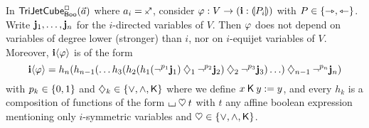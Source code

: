 \documentclass[a4paper]{article}
\begin{document}
\begin{lemma} \label{thm:char-jet-cube-to-line}
	In $\mathsf{TriJetCube}^{\Box}_{\mathsf{Boo}}\mathopen{}\left( \vec a \right)\mathclose{}$ where $a_i = \ypolar$, consider $\varphi : V \to (\mathbf{i} : {\llparenthesis P_i \rrparenthesis})$ with $P \in \mathopen{}\left\{ \rightarrowtriangle, \leftarrowtriangle \right\}\mathclose{}$.
	Write $\mathbf{j}_1, \ldots, \mathbf{j}_n$ for the $i$-directed variables of $V$.
	Then $\varphi$ does not depend on variables of degree lower (stronger) than $i$, nor on $i$-equijet variables of $V$.
	Moreover, $\mathbf{i} \langle \varphi \rangle$ is of the form
	\[
		\mathbf{i} \langle \varphi \rangle = h_n(h_{n-1}(\ldots h_3(h_2(h_1(\lnot^{p_1} \mathbf{j}_1) \mathbin{\diamondsuit}_1 \lnot^{p_2} \mathbf{j}_2) \mathbin{\diamondsuit}_2 \lnot^{p_3} \mathbf{j}_3) \ldots ) \mathbin{\diamondsuit}_{n-1} \lnot^{p_n} \mathbf{j}_n)
	\]
	with $p_k \in \mathopen{}\left\{ 0, 1 \right\}\mathclose{}$ and $\mathbin{\diamondsuit}_k \in \mathopen{}\left\{ {\vee}, {\wedge}, {\mathbin{\mathsf{K}}} \right\}\mathclose{}$ where we define $x \mathbin{\mathsf{K}} y := y$, and every $h_k$ is a composition of functions of the form ${\llcorner\hspace{-.4ex}\lrcorner} \mathbin{\heartsuit} t$ with $t$ any affine boolean expression mentioning only $i$-symmetric variables and ${\mathbin{\heartsuit}} \in \mathopen{}\left\{ {\vee}, {\wedge}, {\mathbin{\mathsf{K}}} \right\}\mathclose{}$.
\end{lemma}
\end{document}

